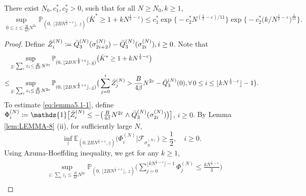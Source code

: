 \documentclass[10pt,a4paper]{amsart}
\begin{document}
\begin{lemma}\label{lem:bar-q3-positive}
 There exist $ N_0, c^*_1,c^*_2>0$, such that for all $N\geq N_0,k\geq 1$,
$$\sup_{0\leq\underline{z}\leq \frac{B}{4\beta}N^{2\varepsilon}}\mathbb{P}_{(0, \, \lfloor 2BN^{\frac{1}{2}+\varepsilon} \rfloor, \,\underline{z})}\big(\bar{K}^{*}\geq 1+kN^{\frac{1}{2}-\varepsilon}\big)\leq c^*_1\exp \big\{-c^*_2N^{(\frac{1}{2}-\varepsilon)/11}\big\}\exp \Big\{-c^*_2\big(k/N^{\frac{1}{2}-\varepsilon}\big)^{\frac{1}{11}}\Big\}.$$
\end{lemma}

\begin{proof}%
Define $\Bar{Z}^{(N)}_i\coloneqq \Bar{Q}^{(N)}_3(\sigma^{(N)}_{2i+2})-\Bar{Q}^{(N)}_3(\sigma^{(N)}_{2i}),i\geq 0$.
Note that 
\begin{align}\label{eq:lemma5.1-1}
    &\sup_{\underline{z}: \, \sum_iz_i \leq \frac{B}{4\beta}N^{2\varepsilon}}\mathbb{P}_{(0, \, \lfloor 2BN^{\frac{1}{2}+\varepsilon} \rfloor, \,\underline{z})}\big(\Bar{K}^{*}\geq 1+kN^{\frac{1}{2}-\varepsilon}\big)\nonumber\\
    \leq &\sup_{\underline{z}: \, \sum_iz_i \leq \frac{B}{4\beta}N^{2\varepsilon}}\mathbb{P}_{(0, \, \lfloor 2BN^{\frac{1}{2}+\varepsilon} \rfloor, \,\underline{z})}\big(\sum_{j=0}^{i}\Bar{Z}^{(N)}_j>\frac{B}{4\beta}N^{2\varepsilon}-\bar{Q}^{(N)}_3(0),\forall \, 0\leq i\leq \lfloor kN^{\frac{1}{2}-\varepsilon}\rfloor -1\big).
\end{align}
To estimate \eqref{eq:lemma5.1-1}, define $\Phi^{(N)}_i\coloneqq \mathds{1}\big[\Bar{Z}^{(N)}_i\leq -\big(\frac{B}{4\beta}N^{2\varepsilon}\wedge \Bar{Q}^{(N)}_3(\sigma^{(N)}_{2i})\big) \big]$, $i\geq 0$. By Lemma \ref{lem:LEMMA-8} (ii), for sufficiently large $N$,
\begin{equation}\label{eq:lemma5.1-3}
    \inf_{\underline{z}}\mathbb{E}_{(0,2BN^{\frac{1}{2}+\varepsilon},\underline{z})}\big(\Phi^{(N)}_i|\mathcal{F}_{\sigma^{(N)}_{2i}}\big)\geq \frac{1}{2},\quad i\geq 0.
\end{equation}
Using Azuma-Hoeffding inequality, we get for any $k\geq 1$,
\begin{equation}\label{eq:5.2-b}
\begin{split}
     &\sup_{\underline{z}: \, \sum_iz_i \leq \frac{B}{4\beta}N^{2\varepsilon}}\mathbb{P}_{(0, \, \lfloor 2BN^{\frac{1}{2}+\varepsilon} \rfloor, \,\underline{z})}\Big(\sum_{j=0}^{\lfloor kN^{\frac{1}{2}-\varepsilon}\rfloor -1}\Phi^{(N)}_j\leq \frac{kN^{\frac{1}{2}-\varepsilon}}{3}\Big)\\

\end{split}
\end{equation}
\end{proof}
\end{document}
